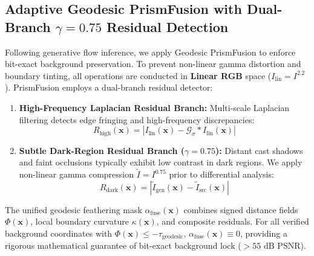 \documentclass[11pt,a4paper]{article}
\begin{document}
\subsection{Adaptive Geodesic PrismFusion with Dual-Branch $\gamma=0.75$ Residual Detection}
\label{sec:prismfusion}
Following generative flow inference, we apply Geodesic PrismFusion to enforce bit-exact background preservation. To prevent non-linear gamma distortion and boundary tinting, all operations are conducted in \textbf{Linear RGB} space ($I_{\text{lin}} = I^{2.2}$). PrismFusion employs a dual-branch residual detector:
\begin{enumerate}[leftmargin=18pt]
    \item \textbf{High-Frequency Laplacian Residual Branch:} Multi-scale Laplacian filtering detects edge fringing and high-frequency discrepancies:
    \begin{equation}
        R_{\text{high}}(\mathbf{x}) = |I_{\text{lin}}(\mathbf{x}) - \mathcal{G}_{\sigma} * I_{\text{lin}}(\mathbf{x})|
    \end{equation}
    \item \textbf{Subtle Dark-Region Residual Branch ($\gamma = 0.75$):} Distant cast shadows and faint occlusions typically exhibit low contrast in dark regions. We apply non-linear gamma compression $\tilde{I} = I^{0.75}$ prior to differential analysis:
    \begin{equation}
        R_{\text{dark}}(\mathbf{x}) = |\tilde{I}_{\text{gen}}(\mathbf{x}) - \tilde{I}_{\text{src}}(\mathbf{x})|
    \end{equation}
\end{enumerate}
The unified geodesic feathering mask $\alpha_{\text{fuse}}(\mathbf{x})$ combines signed distance fields $\Phi(\mathbf{x})$, local boundary curvature $\kappa(\mathbf{x})$, and composite residuals. For all verified background coordinates with $\Phi(\mathbf{x}) \le -\tau_{\text{geodesic}}$, $\alpha_{\text{fuse}}(\mathbf{x}) \equiv 0$, providing a rigorous mathematical guarantee of bit-exact background lock ($>55\text{ dB}$ PSNR).
\end{document}
